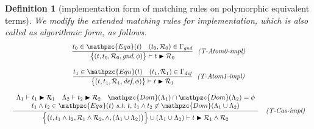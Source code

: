 \documentclass[12pt]{article}
\newtheorem{Definition}{Definition}[section]
\begin{document}
\pagebreak
\begin{Definition}[implementation form of matching rules on
    polymorphic equivalent terms]
  We modify the extended matching rules for implementation, which
  is also called as algorithmic form, as follows.
  \begin{displaymath}
    \begin{array}{c}

      \begin{array}{rl}
        \dfrac{
          t_0 \in \mathpzc{Equ}(t)
           \quad (t_0, \mathcal{R}_0) \in \Gamma_\text{\it gnd}
        }{
          \bigl\{(t, t_0, \mathcal{R}_0, \text{\it gnd}, \phi ) \bigr\}
           \vdash t \blacktriangleright \mathcal{R}_0
        }  &  \!\!\text{\it (T-Atom0-impl)}
      \end{array}  \\
      \\

      \begin{array}{rl}
        \dfrac{
          t_1 \in \mathpzc{Equ}(t)
           \quad (t_1, \mathcal{R}_1) \in \Gamma_\text{\it def}
        }{
          \bigl\{(t, t_1, \mathcal{R}_1, \text{\it def}, \phi ) \bigr\}
           \vdash t \blacktriangleright \mathcal{R}_1
        }  &  \!\!\text{\it (T-Atom1-impl)}
      \end{array}  \\
      \\
      
      \begin{array}{rl}
        \dfrac{
          \begin{array}{c}
            \Lambda_1 \vdash t_1 \blacktriangleright \mathcal{R}_1
             \quad \Lambda_2 \vdash t_2 \blacktriangleright \mathcal{R}_2
              \quad \mathpzc{Dom}(\Lambda_1) \cap \mathpzc{Dom}(\Lambda_2)
               = \phi  \\
            t_1 \wedge t_2 \in \mathpzc{Equ}(t)\
             \text{\it s.t.}\ t,\, t_1 \wedge t_2 \not\in \mathpzc{Dom}(
              \Lambda_1 \cup \Lambda_2)
          \end{array}
        }{
          \Bigl\{\bigl(t, t_1 \wedge t_2,
           \mathcal{R}_1 \wedge \mathcal{R}_2, \wedge,
            (\Lambda_1 \cup \Lambda_2) \bigr) \Bigr\}
             \cup (\Lambda_1 \cup \Lambda_2) \vdash
              t \blacktriangleright \mathcal{R}_1 \wedge \mathcal{R}_2
        }  &  \text{\it (T-Cas-impl)}
      \end{array}  \\
      \\
      

\end{array}
\end{displaymath}
\end{Definition}
\end{document}
